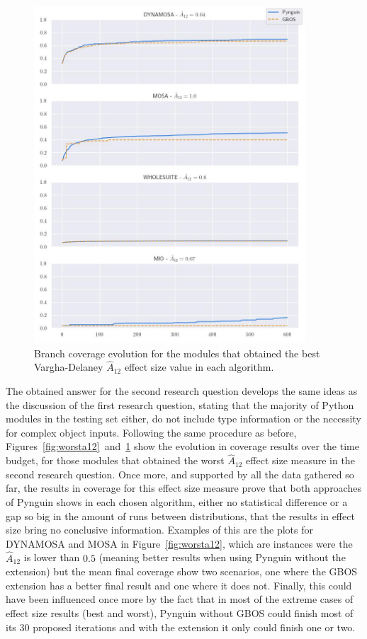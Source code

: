 \documentclass[%
  chapterprefix=false,%
  open=right,%
  twoside=true,%
  paper=a4,%
  logofile={Figures/logo.png},%
  thesistype=master,%
  UKenglish,%
]{se2thesis}
\begin{document}
\begin{figure}[ht]
  \centering
  \includegraphics[width=0.9\textwidth]{Figures/Results/bestA12.jpg}
  \caption{Branch coverage evolution for the modules that obtained the best Vargha-Delaney \(\hat{A}_{12}\) effect size value in each algorithm.}\label{fig:besta12}
\end{figure}

The obtained answer for the second research question develops the same ideas as the discussion of the first research question, stating that the majority of Python modules in the testing set either, do not include type information or the necessity for complex object inputs.
Following the same procedure as before, Figures~\ref{fig:worsta12}~and~\ref{fig:besta12} show the evolution in coverage results over the time budget, for those modules that obtained the worst \(\hat{A}_{12}\) effect size measure in the second research question.
Once more, and supported by all the data gathered so far, the results in coverage for this effect size measure prove that both approaches of Pynguin shows in each chosen algorithm, either no statistical difference or a gap so big in the amount of runs between distributions, that the results in effect size bring no conclusive information.
Examples of this are the plots for DYNAMOSA and MOSA in Figure~\ref{fig:worsta12}, which are instances were the \(\hat{A}_{12}\) is lower than \(0.5\) (meaning better results when using Pynguin without the extension) but the mean final coverage show two scenarios, one where the GBOS extension has a better final result and one where it does not.
Finally, this could have been influenced once more by the fact that in most of the extreme cases of effect size results (best and worst), Pynguin without GBOS could finish most of its 30 proposed iterations and with the extension it only could finish one or two. 
\end{document}
